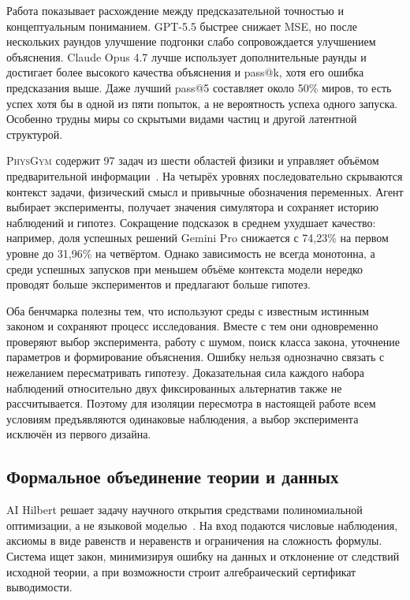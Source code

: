 \documentclass[a4paper,14pt]{extarticle}
\begin{document}
Работа показывает расхождение между предсказательной точностью и концептуальным пониманием. GPT-5.5 быстрее снижает MSE, но после нескольких раундов улучшение подгонки слабо сопровождается улучшением объяснения. Claude Opus 4.7 лучше использует дополнительные раунды и достигает более высокого качества объяснения и pass@k, хотя его ошибка предсказания выше. Даже лучший pass@5 составляет около 50\% миров, то есть успех хотя бы в одной из пяти попыток, а не вероятность успеха одного запуска. Особенно трудны миры со скрытыми видами частиц и другой латентной структурой.

\textsc{PhysGym} содержит 97 задач из шести областей физики и управляет объёмом предварительной информации~\cite{physgym}. На четырёх уровнях последовательно скрываются контекст задачи, физический смысл и привычные обозначения переменных. Агент выбирает эксперименты, получает значения симулятора и сохраняет историю наблюдений и гипотез. Сокращение подсказок в среднем ухудшает качество: например, доля успешных решений Gemini Pro снижается с 74{,}23\% на первом уровне до 31{,}96\% на четвёртом. Однако зависимость не всегда монотонна, а среди успешных запусков при меньшем объёме контекста модели нередко проводят больше экспериментов и предлагают больше гипотез.

Оба бенчмарка полезны тем, что используют среды с известным истинным законом и сохраняют процесс исследования. Вместе с тем они одновременно проверяют выбор эксперимента, работу с шумом, поиск класса закона, уточнение параметров и формирование объяснения. Ошибку нельзя однозначно связать с нежеланием пересматривать гипотезу. Доказательная сила каждого набора наблюдений относительно двух фиксированных альтернатив также не рассчитывается. Поэтому для изоляции пересмотра в настоящей работе всем условиям предъявляются одинаковые наблюдения, а выбор эксперимента исключён из первого дизайна.

\subsection{Формальное объединение теории и данных}

AI Hilbert решает задачу научного открытия средствами полиномиальной оптимизации, а не языковой моделью~\cite{aihilbert}. На вход подаются числовые наблюдения, аксиомы в виде равенств и неравенств и ограничения на сложность формулы. Система ищет закон, минимизируя ошибку на данных и отклонение от следствий исходной теории, а при возможности строит алгебраический сертификат выводимости.
\end{document}
